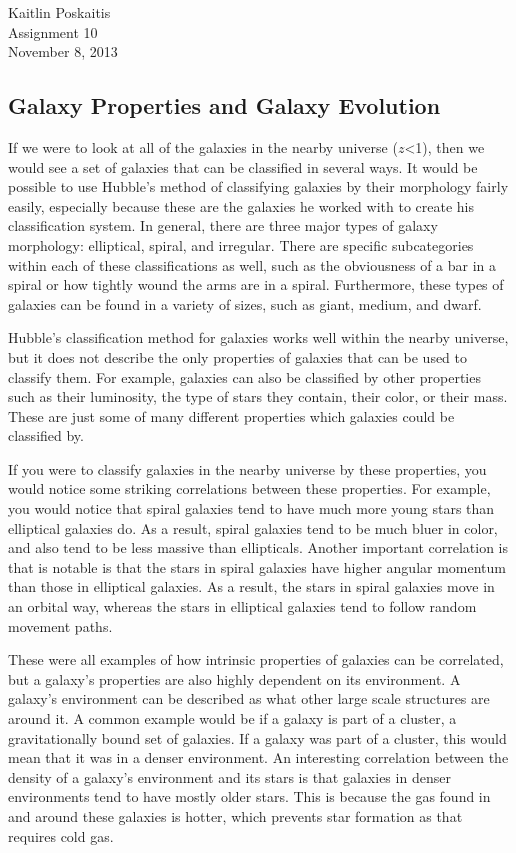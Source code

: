 \documentclass[12pt]{article}
\begin{document}
\noindent Kaitlin Poskaitis\\
Assignment 10\\
November 8, 2013
\begin{center}
    \section*{\bf Galaxy Properties and Galaxy Evolution}
\end{center}

If we were to look at all of the galaxies in the nearby universe ($z$<1), then we
would see a set of galaxies that can be classified in several ways.  It would be
possible to use Hubble's method of classifying galaxies by their morphology
fairly easily, especially because these are the galaxies he worked with to
create his classification system.  In general, there are three major types of
galaxy morphology: elliptical, spiral, and irregular.  There are specific
subcategories within each of these classifications as well, such as the
obviousness of a bar in a spiral or how tightly wound the arms are in a spiral.
Furthermore, these types of galaxies can be found in a variety of sizes, such as
giant, medium, and dwarf.

Hubble's classification method for galaxies works well within the nearby
universe, but it does not describe the only properties of galaxies that can be
used to classify them.  For example, galaxies can also be classified by other
properties such as their luminosity, the type of stars they contain, their
color, or their mass.  These are just some of many different properties which
galaxies could be classified by.

If you were to classify galaxies in the nearby universe by these properties, you
would notice some striking correlations between these properties.  For example,
you would notice that spiral galaxies tend to have much more young stars than
elliptical galaxies do.  As a result, spiral galaxies tend to be much bluer in
color, and also tend to be less massive than ellipticals.  Another important
correlation is that is notable is that the stars in spiral galaxies have higher
angular momentum than those in elliptical galaxies.  As a result, the stars in
spiral galaxies move in an orbital way, whereas the stars in elliptical galaxies
tend to follow random movement paths.

These were all examples of how intrinsic properties of galaxies can be
correlated, but a galaxy's properties are also highly dependent on its
environment.  A galaxy's environment can be described as what other large scale
structures are around it.  A common example would be if a galaxy is part of a
cluster, a gravitationally bound set of galaxies.  If a galaxy was part of a
cluster, this would mean that it was in a denser environment.  An interesting
correlation between the density of a galaxy's environment and its stars is that
galaxies in denser environments tend to have mostly older stars.  This is
because the gas found in and around these galaxies is hotter, which prevents
star formation as that requires cold gas.
\end{document}
